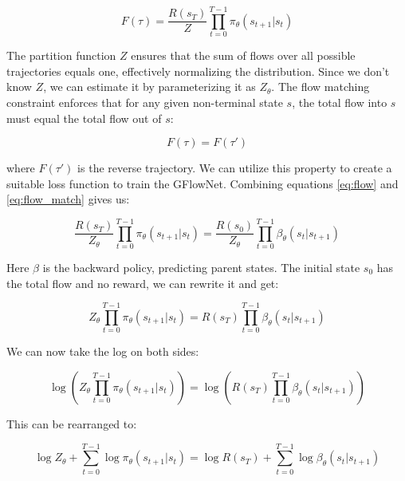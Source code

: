 \begin{equation} \label{eq:flow}
    F(\tau) = \frac{R(s_T)}{Z} \prod_{t=0}^{T-1} \pi_\theta(s_{t+1} | s_{t})
\end{equation}

The partition function \( Z \) ensures that the sum of flows over all possible trajectories equals one, effectively normalizing the distribution. Since we don't know \( Z \), we can estimate it by parameterizing it as \( Z_{\theta} \).
The flow matching constraint enforces that for any given non-terminal state \( s \), the total flow into \( s \) must equal the total flow out of \( s \):

\begin{equation} \label{eq:flow_match}
    F(\tau) = F(\tau')
\end{equation}

where \( F(\tau') \) is the reverse trajectory.
We can utilize this property to create a suitable loss function to train the GFlowNet. Combining equations \ref{eq:flow} and \ref{eq:flow_match} gives us:

\begin{equation}
    \frac{R(s_T)}{Z_\theta} \prod_{t=0}^{T-1} \pi_\theta(s_{t+1} | s_{t}) = \frac{R(s_0)}{Z_\theta} \prod_{t=0}^{T-1} \beta_\theta(s_{t} | s_{t+1})
\end{equation}

Here \( \beta \) is the backward policy, predicting parent states. 
The initial state \(s_0\) has the total flow and no reward, we can rewrite it and get:

\begin{equation}
    Z_{\theta} \prod_{t=0}^{T-1} \pi_\theta(s_{t+1} | s_{t}) = R(s_T) \prod_{t=0}^{T-1} \beta_\theta(s_{t} | s_{t+1})
\end{equation}

We can now take the log on both sides:

\begin{equation}
    \log \left(Z_{\theta} \prod_{t=0}^{T-1} \pi_\theta(s_{t+1} | s_{t})\right) = \log \left(R(s_T) \prod_{t=0}^{T-1} \beta_\theta(s_{t} | s_{t+1})\right)
\end{equation}

This can be rearranged to:

\begin{equation}
    \log Z_\theta + \sum_{t=0}^{T-1} \log \pi_\theta(s_{t+1}|s_{t}) = \log R(s_T) + \sum_{t=0}^{T-1} \log \beta_\theta(s_{t}|s_{t+1})
\end{equation}

